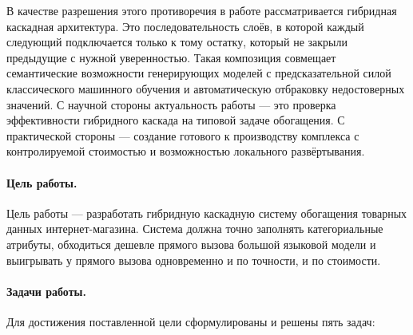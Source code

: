 В качестве разрешения этого противоречия в работе рассматривается гибридная каскадная архитектура. Это последовательность слоёв, в которой каждый следующий подключается только к тому остатку, который не закрыли предыдущие с нужной уверенностью. Такая композиция совмещает семантические возможности генерирующих моделей с предсказательной силой классического машинного обучения и автоматическую отбраковку недостоверных значений. С научной стороны актуальность работы — это проверка эффективности гибридного каскада на типовой задаче обогащения. С практической стороны — создание готового к производству комплекса с контролируемой стоимостью и возможностью локального развёртывания.

\paragraph*{Цель работы.}

Цель работы — разработать гибридную каскадную систему обогащения товарных данных интернет-магазина. Система должна точно заполнять категориальные атрибуты, обходиться дешевле прямого вызова большой языковой модели и выигрывать у прямого вызова одновременно и по точности, и по стоимости.

\paragraph*{Задачи работы.}

Для достижения поставленной цели сформулированы и решены пять задач:

